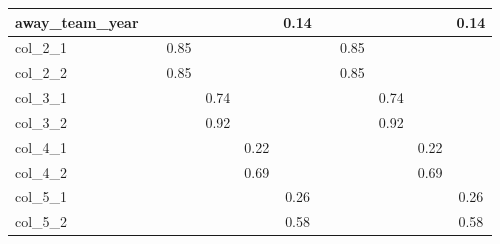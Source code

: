 \begin{table}[htbp]
\begin{tabular}{l*{10}{c}}
away\_team\_year      &            &            &            &            &        0.14&            &            &            &            &        0.14\\
\hline
col\_2\_1             &            &        0.85&            &            &            &            &        0.85&            &            &            \\
col\_2\_2             &            &        0.85&            &            &            &            &        0.85&            &            &            \\
col\_3\_1             &            &            &        0.74&            &            &            &            &        0.74&            &            \\
col\_3\_2             &            &            &        0.92&            &            &            &            &        0.92&            &            \\
col\_4\_1             &            &            &            &        0.22&            &            &            &            &        0.22&            \\
col\_4\_2             &            &            &            &        0.69&            &            &            &            &        0.69&            \\
col\_5\_1             &            &            &            &            &        0.26&            &            &            &            &        0.26\\
col\_5\_2             &            &            &            &            &        0.58&            &            &            &            &        0.58\\
\hline\hline
\end{tabular}
\end{table}

